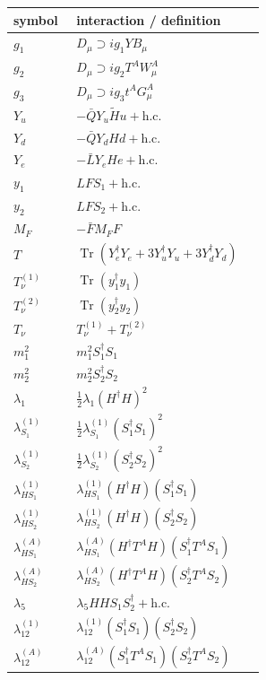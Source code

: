 \documentclass[10pt,a4paper]{article}
\begin{document}
\begin{longtable}{@{}p{0.23\linewidth}p{0.69\linewidth}@{}}
\toprule
symbol & interaction / definition \\
\midrule
$g_1$ & $D_\mu\supset i g_1YB_\mu$ \\
$g_2$ & $D_\mu\supset i g_2T^AW_\mu^A$ \\
$g_3$ & $D_\mu\supset i g_3t^AG_\mu^A$ \\
$Y_u$ & $-\bar QY_u\widetilde Hu+\mathrm{h.c.}$ \\
$Y_d$ & $-\bar QY_dHd+\mathrm{h.c.}$ \\
$Y_e$ & $-\bar LY_eHe+\mathrm{h.c.}$ \\
$y_1$ & $LFS_1+\mathrm{h.c.}$ \\
$y_2$ & $LFS_2+\mathrm{h.c.}$ \\
$M_F$ & $-\bar FM_FF$ \\
$T$ & $\operatorname{Tr}(Y_e^\dagger Y_e+3Y_u^\dagger Y_u+3Y_d^\dagger Y_d)$ \\
$T_\nu^{(1)}$ & $\operatorname{Tr}(y_1^\dagger y_1)$ \\
$T_\nu^{(2)}$ & $\operatorname{Tr}(y_2^\dagger y_2)$ \\
$T_\nu$ & $T_\nu^{(1)}+T_\nu^{(2)}$ \\
$m_1^2$ & $m_1^2S_1^\dagger S_1$ \\
$m_2^2$ & $m_2^2S_2^\dagger S_2$ \\
$\lambda_1$ & $\frac12\lambda_1(H^\dagger H)^2$ \\
$\lambda_{S_1}^{(1)}$ & $\frac12\lambda_{S_1}^{(1)}(S_1^\dagger S_1)^2$ \\
$\lambda_{S_2}^{(1)}$ & $\frac12\lambda_{S_2}^{(1)}(S_2^\dagger S_2)^2$ \\
$\lambda_{HS_1}^{(1)}$ & $\lambda_{HS_1}^{(1)}(H^\dagger H)(S_1^\dagger S_1)$ \\
$\lambda_{HS_2}^{(1)}$ & $\lambda_{HS_2}^{(1)}(H^\dagger H)(S_2^\dagger S_2)$ \\
$\lambda_{HS_1}^{(A)}$ & $\lambda_{HS_1}^{(A)}(H^\dagger T^AH)(S_1^\dagger T^AS_1)$ \\
$\lambda_{HS_2}^{(A)}$ & $\lambda_{HS_2}^{(A)}(H^\dagger T^AH)(S_2^\dagger T^AS_2)$ \\
$\lambda_5$ & $\lambda_5HHS_1S_2^\dagger+\mathrm{h.c.}$ \\
$\lambda_{12}^{(1)}$ & $\lambda_{12}^{(1)}(S_1^\dagger S_1)(S_2^\dagger S_2)$ \\
$\lambda_{12}^{(A)}$ & $\lambda_{12}^{(A)}(S_1^\dagger T^AS_1)(S_2^\dagger T^AS_2)$ \\

\end{longtable}
\end{document}
